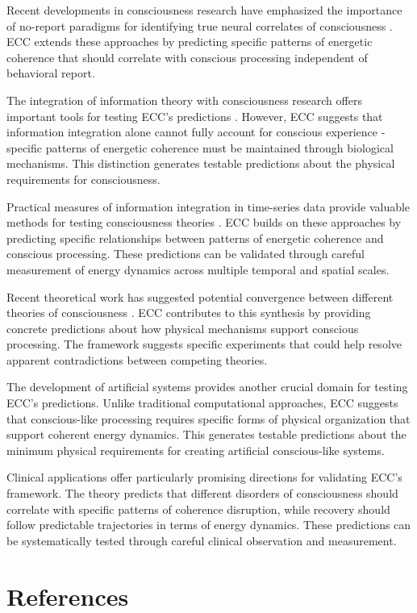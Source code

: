 \begin{refsection}
Recent developments in consciousness research have emphasized the importance of no-report paradigms for identifying true neural correlates of consciousness \cite{Tsuchiya2015}. ECC extends these approaches by predicting specific patterns of energetic coherence that should correlate with conscious processing independent of behavioral report.

The integration of information theory with consciousness research offers important tools for testing ECC's predictions \cite{Tononi2016}. However, ECC suggests that information integration alone cannot fully account for conscious experience - specific patterns of energetic coherence must be maintained through biological mechanisms. This distinction generates testable predictions about the physical requirements for consciousness.

Practical measures of information integration in time-series data provide valuable methods for testing consciousness theories \cite{Barrett2011}. ECC builds on these approaches by predicting specific relationships between patterns of energetic coherence and conscious processing. These predictions can be validated through careful measurement of energy dynamics across multiple temporal and spatial scales.

Recent theoretical work has suggested potential convergence between different theories of consciousness \cite{Northoff2020}. ECC contributes to this synthesis by providing concrete predictions about how physical mechanisms support conscious processing. The framework suggests specific experiments that could help resolve apparent contradictions between competing theories.

The development of artificial systems provides another crucial domain for testing ECC's predictions. Unlike traditional computational approaches, ECC suggests that conscious-like processing requires specific forms of physical organization that support coherent energy dynamics. This generates testable predictions about the minimum physical requirements for creating artificial conscious-like systems.

Clinical applications offer particularly promising directions for validating ECC's framework. The theory predicts that different disorders of consciousness should correlate with specific patterns of coherence disruption, while recovery should follow predictable trajectories in terms of energy dynamics. These predictions can be systematically tested through careful clinical observation and measurement.

\newpage
\section{References}
\printbibliography[title={},heading=subbibliography]
\end{refsection}